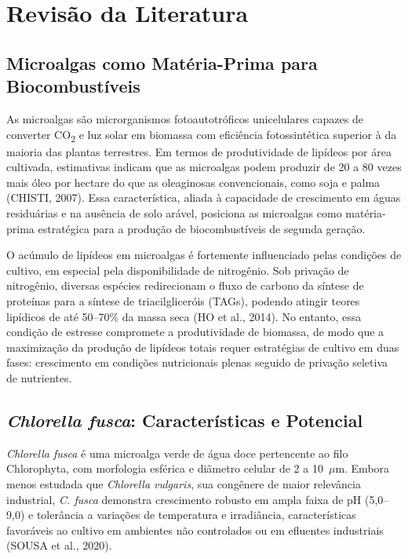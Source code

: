 
\section{Revisão da Literatura}

\subsection{Microalgas como Matéria-Prima para Biocombustíveis}

As microalgas são microrganismos fotoautotróficos unicelulares capazes de
converter CO\textsubscript{2} e luz solar em biomassa com eficiência
fotossintética superior à da maioria das plantas terrestres. Em termos de
produtividade de lipídeos por área cultivada, estimativas indicam que as
microalgas podem produzir de 20 a 80 vezes mais óleo por hectare do que
as oleaginosas convencionais, como soja e palma (CHISTI, 2007). Essa
característica, aliada à capacidade de crescimento em águas residuárias e
na ausência de solo arável, posiciona as microalgas como matéria-prima
estratégica para a produção de biocombustíveis de segunda geração.

O acúmulo de lipídeos em microalgas é fortemente influenciado pelas
condições de cultivo, em especial pela disponibilidade de nitrogênio.
Sob privação de nitrogênio, diversas espécies redirecionam o fluxo de
carbono da síntese de proteínas para a síntese de triacilgliceróis (TAGs),
podendo atingir teores lipídicos de até 50--70\% da massa seca (HO et al.,
2014). No entanto, essa condição de estresse compromete a produtividade de
biomassa, de modo que a maximização da produção de lipídeos totais requer
estratégias de cultivo em duas fases: crescimento em condições nutricionais
plenas seguido de privação seletiva de nutrientes.

\subsection{\textit{Chlorella fusca}: Características e Potencial}

\textit{Chlorella fusca} é uma microalga verde de água doce pertencente ao
filo Chlorophyta, com morfologia esférica e diâmetro celular de 2 a 10~$\mu$m.
Embora menos estudada que \textit{Chlorella vulgaris}, sua congênere de maior
relevância industrial, \textit{C. fusca} demonstra crescimento robusto em
ampla faixa de pH (5,0--9,0) e tolerância a variações de temperatura e
irradiância, características favoráveis ao cultivo em ambientes não
controlados ou em efluentes industriais (SOUSA et al., 2020).

